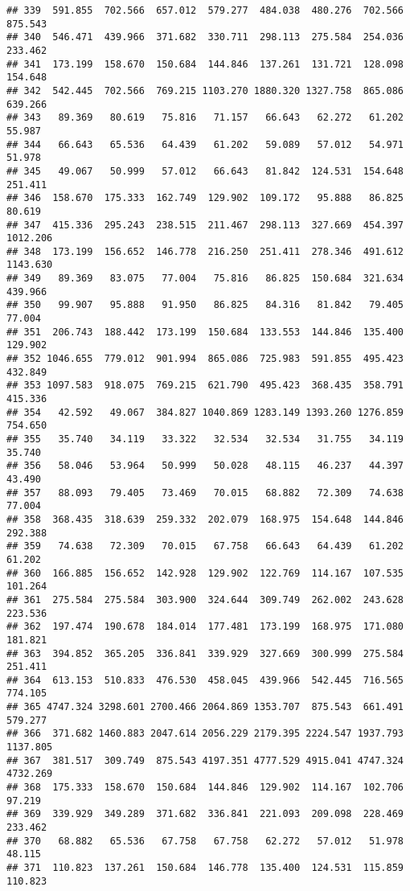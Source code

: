 \documentclass[
]{article}
\begin{document}
\begin{verbatim}
## 339  591.855  702.566  657.012  579.277  484.038  480.276  702.566  875.543
## 340  546.471  439.966  371.682  330.711  298.113  275.584  254.036  233.462
## 341  173.199  158.670  150.684  144.846  137.261  131.721  128.098  154.648
## 342  542.445  702.566  769.215 1103.270 1880.320 1327.758  865.086  639.266
## 343   89.369   80.619   75.816   71.157   66.643   62.272   61.202   55.987
## 344   66.643   65.536   64.439   61.202   59.089   57.012   54.971   51.978
## 345   49.067   50.999   57.012   66.643   81.842  124.531  154.648  251.411
## 346  158.670  175.333  162.749  129.902  109.172   95.888   86.825   80.619
## 347  415.336  295.243  238.515  211.467  298.113  327.669  454.397 1012.206
## 348  173.199  156.652  146.778  216.250  251.411  278.346  491.612 1143.630
## 349   89.369   83.075   77.004   75.816   86.825  150.684  321.634  439.966
## 350   99.907   95.888   91.950   86.825   84.316   81.842   79.405   77.004
## 351  206.743  188.442  173.199  150.684  133.553  144.846  135.400  129.902
## 352 1046.655  779.012  901.994  865.086  725.983  591.855  495.423  432.849
## 353 1097.583  918.075  769.215  621.790  495.423  368.435  358.791  415.336
## 354   42.592   49.067  384.827 1040.869 1283.149 1393.260 1276.859  754.650
## 355   35.740   34.119   33.322   32.534   32.534   31.755   34.119   35.740
## 356   58.046   53.964   50.999   50.028   48.115   46.237   44.397   43.490
## 357   88.093   79.405   73.469   70.015   68.882   72.309   74.638   77.004
## 358  368.435  318.639  259.332  202.079  168.975  154.648  144.846  292.388
## 359   74.638   72.309   70.015   67.758   66.643   64.439   61.202   61.202
## 360  166.885  156.652  142.928  129.902  122.769  114.167  107.535  101.264
## 361  275.584  275.584  303.900  324.644  309.749  262.002  243.628  223.536
## 362  197.474  190.678  184.014  177.481  173.199  168.975  171.080  181.821
## 363  394.852  365.205  336.841  339.929  327.669  300.999  275.584  251.411
## 364  613.153  510.833  476.530  458.045  439.966  542.445  716.565  774.105
## 365 4747.324 3298.601 2700.466 2064.869 1353.707  875.543  661.491  579.277
## 366  371.682 1460.883 2047.614 2056.229 2179.395 2224.547 1937.793 1137.805
## 367  381.517  309.749  875.543 4197.351 4777.529 4915.041 4747.324 4732.269
## 368  175.333  158.670  150.684  144.846  129.902  114.167  102.706   97.219
## 369  339.929  349.289  371.682  336.841  221.093  209.098  228.469  233.462
## 370   68.882   65.536   67.758   67.758   62.272   57.012   51.978   48.115
## 371  110.823  137.261  150.684  146.778  135.400  124.531  115.859  110.823

\end{verbatim}
\end{document}
